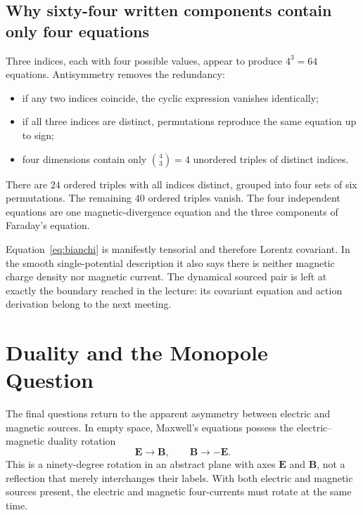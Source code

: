 \subsection{Why sixty-four written components contain only four equations}

Three indices, each with four possible values, appear to produce
\(4^3=64\) equations.  Antisymmetry removes the redundancy:
\begin{itemize}
\item if any two indices coincide, the cyclic expression vanishes
identically;
\item if all three indices are distinct, permutations reproduce the same
equation up to sign;
\item four dimensions contain only
\(\binom{4}{3}=4\) unordered triples of distinct indices.
\end{itemize}
There are \(24\) ordered triples with all indices distinct, grouped into
four sets of six permutations.  The remaining \(40\) ordered triples
vanish.  The four independent equations are one magnetic-divergence
equation and the three components of Faraday's equation.

\begin{classroomqa}
\end{classroomqa}

Equation~\eqref{eq:bianchi} is manifestly tensorial and therefore
Lorentz covariant.  In the smooth single-potential description it also says
there is neither magnetic charge density nor magnetic current.  The
dynamical sourced pair is left at exactly the boundary reached in the
lecture: its covariant equation and action derivation belong to the next
meeting.

\section{Duality and the Monopole Question}

The final questions return to the apparent asymmetry between electric and
magnetic sources.  In empty space, Maxwell's equations possess the
electric--magnetic duality rotation
\begin{equation}
\mathbf E\longrightarrow\mathbf B,
\qquad
\mathbf B\longrightarrow-\mathbf E.
\label{eq:duality-quarter-turn}
\end{equation}
This is a ninety-degree rotation in an abstract plane with axes
\(\mathbf E\) and \(\mathbf B\), not a reflection that merely interchanges
their labels.  With both electric and magnetic sources present, the
electric and magnetic four-currents must rotate at the same time.


